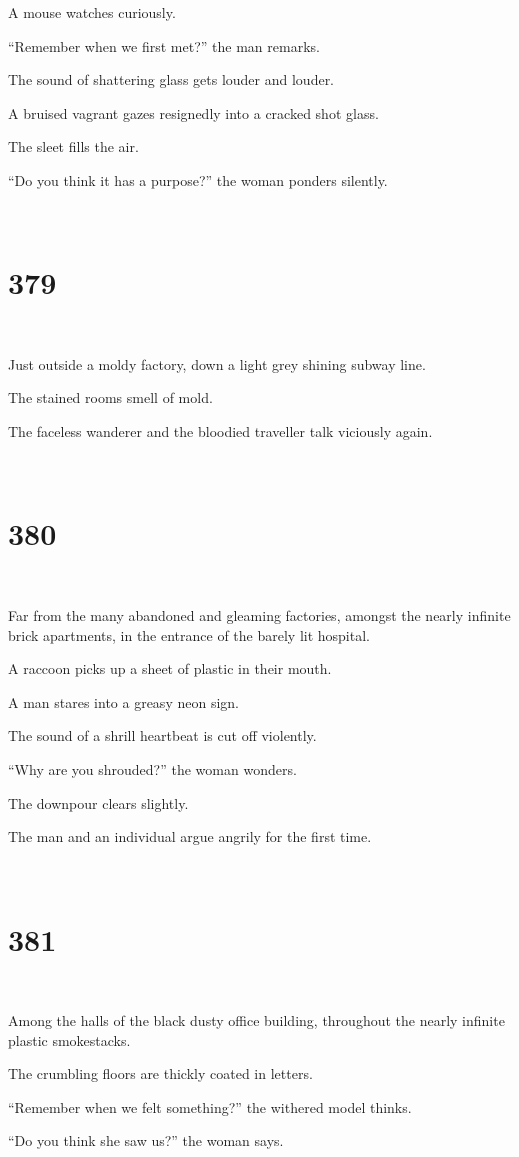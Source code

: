 \documentclass{report}
\begin{document}
A mouse watches curiously.

``Remember when we first met?'' the man remarks.

The sound of shattering glass gets louder and louder.

A bruised vagrant gazes resignedly into a cracked shot glass.

The sleet fills the air.

``Do you think it has a purpose?'' the woman ponders silently.

~
\chapter*{379}
~

Just outside a moldy factory, down a light grey shining subway line.

The stained rooms smell of mold.

The faceless wanderer and the bloodied traveller talk viciously again.

~
\chapter*{380}
~

Far from the many abandoned and gleaming factories, amongst the nearly infinite brick apartments, in the entrance of the barely lit hospital.

A raccoon picks up a sheet of plastic in their mouth.

A man stares into a greasy neon sign.

The sound of a shrill heartbeat is cut off violently.

``Why are you shrouded?'' the woman wonders.

The downpour clears slightly.

The man and an individual argue angrily for the first time.

~
\chapter*{381}
~

Among the halls of the black dusty office building, throughout the nearly infinite plastic smokestacks.

The crumbling floors are thickly coated in letters.

``Remember when we felt something?'' the withered model thinks.

``Do you think she saw us?'' the woman says.
\end{document}
